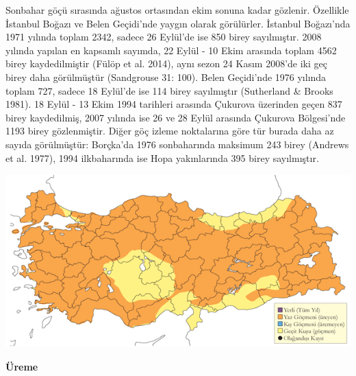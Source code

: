 \documentclass[
  letterpaper,
  DIV=11,
  numbers=noendperiod]{scrreprt}
\begin{document}
Sonbahar göçü sırasında ağustos ortasından ekim sonuna kadar gözlenir.
Özellikle İstanbul Boğazı ve Belen Geçidi'nde yaygın olarak görülürler.
İstanbul Boğazı'nda 1971 yılında toplam 2342, sadece 26 Eylül'de ise 850
birey sayılmıştır. 2008 yılında yapılan en kapsamlı sayımda, 22 Eylül -
10 Ekim arasında toplam 4562 birey kaydedilmiştir (Fülöp et al. 2014),
aynı sezon 24 Kasım 2008'de iki geç birey daha görülmüştür (Sandgrouse
31: 100). Belen Geçidi'nde 1976 yılında toplam 727, sadece 18 Eylül'de
ise 114 birey sayılmıştır (Sutherland \& Brooks 1981). 18 Eylül - 13
Ekim 1994 tarihleri arasında Çukurova üzerinden geçen 837 birey
kaydedilmiş, 2007 yılında ise 26 ve 28 Eylül arasında Çukurova
Bölgesi'nde 1193 birey gözlenmiştir. Diğer göç izleme noktalarına göre
tür burada daha az sayıda görülmüştür: Borçka'da 1976 sonbaharında
maksimum 243 birey (Andrews et al. 1977), 1994 ilkbaharında ise Hopa
yakınlarında 395 birey sayılmıştır.

\includegraphics{images/harita_Page_089.png}

\textbf{Üreme}
\end{document}
